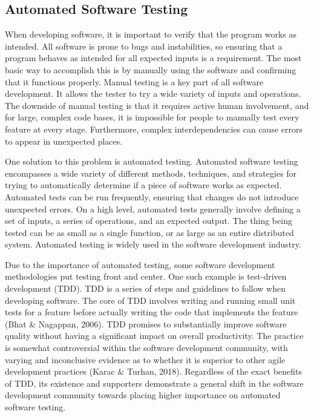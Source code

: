 \documentclass{article}
\begin{document}
\begin{onehalfspacing}
\subsection{Automated Software Testing}

When developing software, it is important to verify that the program
works as intended. All software is prone to bugs and instabilities, so
ensuring that a program behaves as intended for all expected inputs is a
requirement. The most basic way to accomplish this is by manually using
the software and confirming that it functions properly. Manual testing
is a key part of all software development. It allows the tester to try a
wide variety of inputs and operations. The downside of manual testing is
that it requires active human involvement, and for large, complex code
bases, it is impossible for people to manually test every feature at
every stage. Furthermore, complex interdependencies can cause errors to
appear in unexpected places.

One solution to this problem is automated testing. Automated software
testing encompasses a wide variety of different methods, techniques, and
strategies for trying to automatically determine if a piece of software
works as expected. Automated tests can be run frequently, ensuring that
changes do not introduce unexpected errors. On a high level, automated
tests generally involve defining a set of inputs, a series of
operations, and an expected output. The thing being tested can be as
small as a single function, or as large as an entire distributed system.
Automated testing is widely used in the software development industry.

Due to the importance of automated testing, some software development
methodologies put testing front and center. One such example is
test-driven development (TDD). TDD is a series of steps and guidelines
to follow when developing software. The core of TDD involves writing and
running small unit tests for a feature before actually writing the code
that implements the feature (Bhat \& Nagappan, 2006). TDD promises to
substantially improve software quality without having a significant
impact on overall productivity. The practice is somewhat controversial
within the software development community, with varying and inconclusive
evidence as to whether it is superior to other agile development
practices (Karac \& Turhan, 2018). Regardless of the exact benefits of
TDD, its existence and supporters demonstrate a general shift in the
software development community towards placing higher importance on
automated software testing.


\end{onehalfspacing}
\end{document}
